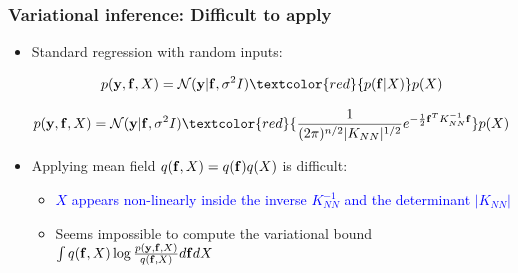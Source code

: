 \documentclass{beamer}
\begin{document}
\frame
{

\frametitle{Variational inference: Difficult to apply}


\begin{itemize}

\item Standard regression with random inputs:

$$
p(\bfy,\bff,X) = \mathcal{N}(\bfy|\bff,\sigma^2 I) 
\textcolor{red}{p(\bff|X)} p(X) 
$$

$$
p(\bfy,\bff,X) = \mathcal{N}(\bfy|\bff,\sigma^2
  I) \textcolor{red}{\frac{1}{(2\pi)^{n/2} |K_{NN}|^{1/2}} 
e^{-\frac{1}{2} \bff^T K_{NN}^{-1}\bff}} p(X) 
$$



\item Applying mean field $q(\mathbf{f},X) = q(\mathbf{f}) q(X)$
      is difficult:

      \begin{itemize}

       \item \textcolor{blue}{$X$ appears non-linearly inside the  inverse
             $K_{NN}^{-1}$ and the determinant $|K_{NN}|$} 
       
       \item Seems impossible to compute the variational bound 
               $\int q(\mathbf{f},X) \log \frac{p(\mathbf{y},\mathbf{f},X)}{ q(\mathbf{f},X)}
               d \mathbf{f} d X$ 
 

      \end{itemize}       


%
%
%
%           
% 
%

\end{itemize}


}
\end{document}
